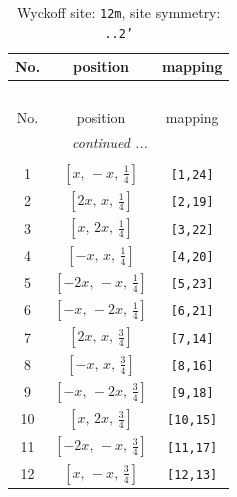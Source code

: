 \documentclass[fleqn,8pt]{jsarticle}
\begin{document}
\begin{longtable}{ccc}
\caption{Wyckoff site: {\tt 12m}, site symmetry: {\tt ..2'}}
 \\
 \hline \hline
No. & position & mapping \\ \hline \endfirsthead

\multicolumn{2}{l}{\tablename\ \thetable{}} \\
 \hline \hline
No. & position & mapping \\ \hline \endhead

 \hline \hline
\multicolumn{2}{r}{\footnotesize\it continued ...} \\ \endfoot

 \hline \hline
\multicolumn{2}{r}{} \\ \endlastfoot

1 & $\left[ x,\, - x,\, \frac{1}{4} \right]$ & {\tt [1,24]} \\ \hline
2 & $\left[ 2 x,\, x,\, \frac{1}{4} \right]$ & {\tt [2,19]} \\ \hline
3 & $\left[ x,\, 2 x,\, \frac{1}{4} \right]$ & {\tt [3,22]} \\ \hline
4 & $\left[ - x,\, x,\, \frac{1}{4} \right]$ & {\tt [4,20]} \\ \hline
5 & $\left[ - 2 x,\, - x,\, \frac{1}{4} \right]$ & {\tt [5,23]} \\ \hline
6 & $\left[ - x,\, - 2 x,\, \frac{1}{4} \right]$ & {\tt [6,21]} \\ \hline
7 & $\left[ 2 x,\, x,\, \frac{3}{4} \right]$ & {\tt [7,14]} \\ \hline
8 & $\left[ - x,\, x,\, \frac{3}{4} \right]$ & {\tt [8,16]} \\ \hline
9 & $\left[ - x,\, - 2 x,\, \frac{3}{4} \right]$ & {\tt [9,18]} \\ \hline
10 & $\left[ x,\, 2 x,\, \frac{3}{4} \right]$ & {\tt [10,15]} \\ \hline
11 & $\left[ - 2 x,\, - x,\, \frac{3}{4} \right]$ & {\tt [11,17]} \\ \hline
12 & $\left[ x,\, - x,\, \frac{3}{4} \right]$ & {\tt [12,13]} \\
\end{longtable}
\renewcommand{\arraystretch}{1.2}
\end{document}
